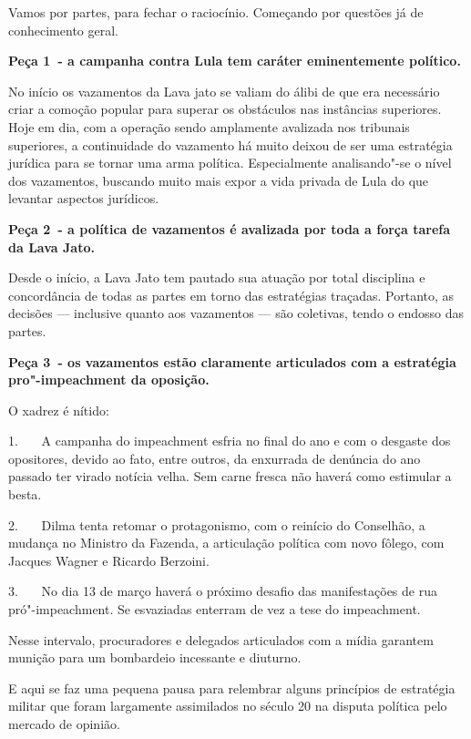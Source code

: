  

Vamos por partes, para fechar o raciocínio. Começando por questões já de
conhecimento geral.

\textbf{Peça 1~- a campanha contra Lula tem caráter eminentemente
político.}

No início os vazamentos da Lava jato se valiam do álibi de que era
necessário criar a comoção popular para superar os obstáculos nas
instâncias superiores. Hoje em dia, com a operação sendo amplamente
avalizada nos tribunais superiores, a continuidade do vazamento há muito
deixou de ser uma estratégia jurídica para se tornar uma arma política.
Especialmente analisando"-se o nível dos vazamentos, buscando muito mais
expor a vida privada de Lula do que levantar aspectos jurídicos.

\textbf{Peça 2~- a política de vazamentos é avalizada por toda a força
tarefa da Lava Jato.}

Desde o início, a Lava Jato tem pautado sua atuação por total disciplina
e concordância de todas as partes em torno das estratégias traçadas.
Portanto, as decisões --- inclusive quanto aos vazamentos --- são
coletivas, tendo o endosso das partes.

\textbf{Peça 3~- os vazamentos estão claramente articulados com a
estratégia pro"-impeachment da oposição.}

O xadrez é nítido:

1.~~~ A campanha do impeachment esfria no final do ano e com o desgaste
dos opositores, devido ao fato, entre outros, da enxurrada de denúncia
do ano passado ter virado notícia velha. Sem carne fresca não haverá
como estimular a besta.

2.~~~ Dilma tenta retomar o protagonismo, com o reinício do Conselhão, a
mudança no Ministro da Fazenda, a articulação política com novo fôlego,
com Jacques Wagner e Ricardo Berzoini.

3.~~~ No dia 13 de março haverá o próximo desafio das manifestações de
rua pró"-impeachment. Se esvaziadas enterram de vez a tese do
impeachment.

Nesse intervalo, procuradores e delegados articulados com a mídia
garantem munição para um bombardeio incessante e diuturno.

E aqui se faz uma pequena pausa para relembrar alguns princípios de
estratégia militar que foram largamente assimilados no século 20 na
disputa política pelo mercado de opinião.

